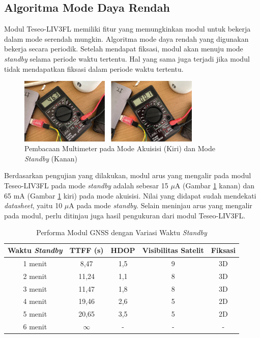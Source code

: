 \documentclass[conference]{IEEEtran}
\begin{document}
\subsection{Algoritma Mode Daya Rendah}
Modul Teseo-LIV3FL memiliki fitur yang memungkinkan modul untuk bekerja dalam mode serendah mungkin. Algoritma mode daya rendah yang digunakan bekerja secara periodik. Setelah mendapat fiksasi, modul akan menuju mode \textit{standby} selama periode waktu tertentu. Hal yang sama juga terjadi jika modul tidak mendapatkan fiksasi dalam periode waktu tertentu. 

\begin{figure}[htb!]
	\centering
	\includegraphics[width=8.7cm]{low-power-result.jpg}
	\caption{Pembacaan Multimeter pada Mode Akuisisi (Kiri) dan Mode \textit{Standby} (Kanan)}
	\label{Fig: 4-low-power-result}
\end{figure}

Berdasarkan pengujian yang dilakukan, modul arus yang mengalir pada modul Teseo-LIV3FL pada mode \textit{standby} adalah sebesar 15 $\mu$A (Gambar \ref{Fig: 4-low-power-result} kanan) dan 65 mA (Gambar \ref{Fig: 4-low-power-result} kiri) pada mode akuisisi. Nilai yang didapat sudah mendekati \textit{datasheet}, yaitu 10 $\mu$A pada mode \textit{standby}. Selain meninjau arus yang mengalir pada modul, perlu ditinjau juga hasil pengukuran dari modul Teseo-LIV3FL.

\begin{table}[h]
	\centering
	\renewcommand{\arraystretch}{1.5}
	\caption{Performa Modul GNSS dengan Variasi Waktu \textit{Standby}}
	\label{tab: 4-lpm-var}
	\begin{tabular}{ccccc}
		\hline
		\textbf{Waktu \textit{Standby}} &\textbf{TTFF (s)} & \textbf{HDOP} & \textbf{Visibilitas Satelit} & \textbf{Fiksasi}\\
		\hline 
		1 menit & 8,47 & 1,5 & 9 & 3D\\
		2 menit & 11,24 & 1,1 & 8 & 3D\\
		3 menit & 11,47 & 1,8 & 8 & 3D\\
		4 menit & 19,46 & 2,6 & 5 & 2D\\
		5 menit & 20,65 & 3,5 & 5 & 2D\\
		6 menit & $\infty$ & - & - & -\\
		\hline
	\end{tabular}
\end{table}
\end{document}

